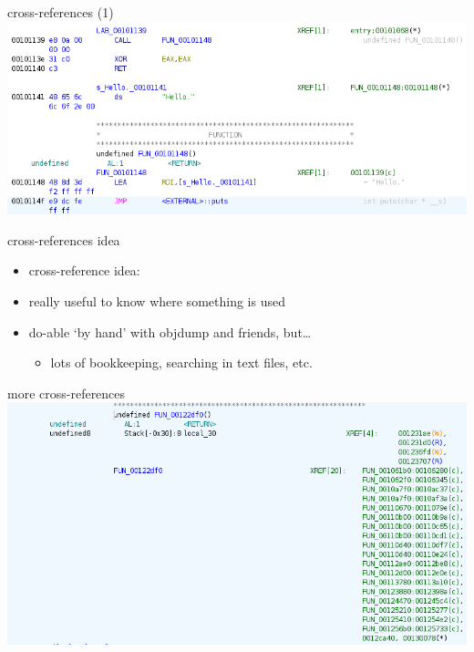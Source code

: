 \begin{frame}{cross-references (1)}
\includegraphics[width=\textwidth]{../re-tools/ghidra-disass-mixed-w-xref}
\end{frame}

\begin{frame}{cross-references idea}
    \begin{itemize}
    \item cross-reference idea:
    \item really useful to know where something is used
    \vspace{.5cm}
    \item do-able `by hand' with objdump and friends, but\ldots
        \begin{itemize}
        \item lots of bookkeeping, searching in text files, etc.
        \end{itemize}
    \end{itemize}
\end{frame}

\begin{frame}{more cross-references}
\includegraphics[width=\textwidth]{../re-tools/ghidra-mystery-xref-many}
\end{frame}


